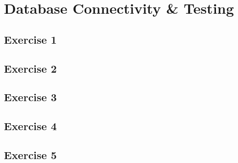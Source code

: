 \chapter{Database Connectivity \& Testing}
\graphicspath{{8-db-testing/images/}}

\section{Exercise 1}
\section{Exercise 2}
\section{Exercise 3}
\section{Exercise 4}
\section{Exercise 5}
